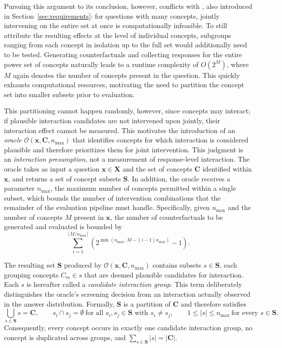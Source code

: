 Pursuing this argument to its conclusion, however, conflicts with , also introduced in Section~\ref{sec:requirements}: for questions with many concepts, jointly intervening on the entire set at once is computationally infeasible. To still attribute the resulting effects at the level of individual concepts, subgroups ranging from each concept in isolation up to the full set would additionally need to be tested. Generating counterfactuals and collecting responses for the entire power set of concepts naturally leads to a runtime complexity of $O(2^M)$, where $M$ again denotes the number of concepts present in the question. This quickly exhausts computational resources, motivating the need to partition the concept set into smaller subsets prior to evaluation.

This partitioning cannot happen randomly, however, since concepts may interact; if plausible interaction candidates are not intervened upon jointly, their interaction effect cannot be measured. This motivates the introduction of an \emph{oracle} $\mathcal{O}(\mathbf{x}, \mathbf{C}, n_{\max})$ that identifies concepts for which interaction is considered plausible and therefore prioritizes them for joint intervention. This judgment is an \emph{interaction presumption}, not a measurement of response-level interaction. The oracle takes as input a question $\mathbf{x} \in \mathbf{X}$ and the set of concepts $\mathbf{C}$ identified within $\mathbf{x}$, and returns a set of concept subsets $\mathbf{S}$. In addition, the oracle receives a parameter $n_{\max}$, the maximum number of concepts permitted within a single subset, which bounds the number of intervention combinations that the remainder of the evaluation pipeline must handle. Specifically, given $n_{\max}$ and the number of concepts $M$ present in $\mathbf{x}$, the number of counterfactuals to be generated and evaluated is bounded by
\begin{equation}
	\label{eq:subset_counterfactual_bound}
	\sum_{i=1}^{\lceil M/n_{\max} \rceil} \left(2^{\min(n_{\max},\, M - (i-1)n_{\max})} - 1\right).
\end{equation}

The resulting set $\mathbf{S}$ produced by $\mathcal{O}(\mathbf{x}, \mathbf{C}, n_{\max})$ contains subsets $s \in \mathbf{S}$, each grouping concepts $C_m \in s$ that are deemed plausible candidates for interaction. Each $s$ is hereafter called a \emph{candidate interaction group}. This term deliberately distinguishes the oracle's screening decision from an interaction actually observed in the answer distribution. Formally, $\mathbf{S}$ is a partition of $\mathbf{C}$ and therefore satisfies
\begin{equation}
	\bigcup_{s\in\mathbf{S}}s=\mathbf{C},
	\qquad
	s_i\cap s_j=\emptyset\ \text{for all }s_i,s_j\in\mathbf{S}\text{ with }s_i\neq s_j,
	\qquad
	1\leq |s|\leq n_{\max}\ \text{for every }s\in\mathbf{S}.
\end{equation}
Consequently, every concept occurs in exactly one candidate interaction group, no concept is duplicated across groups, and $\sum_{s\in\mathbf{S}}|s|=|\mathbf{C}|$.

